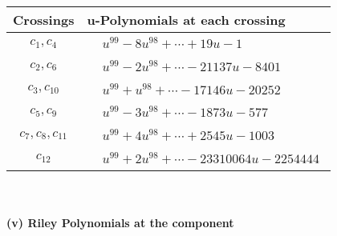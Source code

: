 \documentclass[1p]{elsarticle_modified}
\theoremstyle{definition}
\begin{document}
\begin{tabular}{m{50pt}|m{274pt}}
Crossings & \hspace{64pt}u-Polynomials at each crossing \\
\hline $$\begin{aligned}c_{1},c_{4}\end{aligned}$$&$\begin{aligned}
&u^{99}-8 u^{98}+\cdots+19 u-1
\end{aligned}$\\
\hline $$\begin{aligned}c_{2},c_{6}\end{aligned}$$&$\begin{aligned}
&u^{99}-2 u^{98}+\cdots-21137 u-8401
\end{aligned}$\\
\hline $$\begin{aligned}c_{3},c_{10}\end{aligned}$$&$\begin{aligned}
&u^{99}+u^{98}+\cdots-17146 u-20252
\end{aligned}$\\
\hline $$\begin{aligned}c_{5},c_{9}\end{aligned}$$&$\begin{aligned}
&u^{99}-3 u^{98}+\cdots-1873 u-577
\end{aligned}$\\
\hline $$\begin{aligned}c_{7},c_{8},c_{11}\end{aligned}$$&$\begin{aligned}
&u^{99}+4 u^{98}+\cdots+2545 u-1003
\end{aligned}$\\
\hline $$\begin{aligned}c_{12}\end{aligned}$$&$\begin{aligned}
&u^{99}+2 u^{98}+\cdots-23310064 u-2254444
\end{aligned}$\\
\hline
\end{tabular}\\~\\
\newpage\renewcommand{\arraystretch}{1}
\flushleft \textbf{(v) Riley Polynomials at the component}\newline \\
\end{document}
